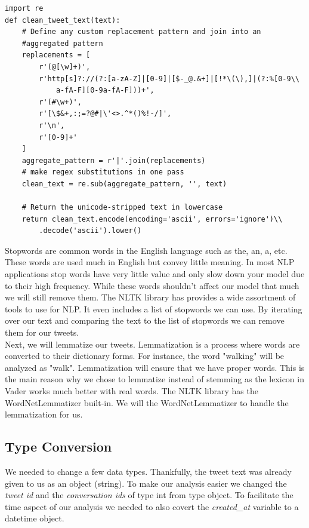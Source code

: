 \documentclass[12pt]{article}
\begin{document}
            \begin{lstlisting}[caption=Regular Expression Cleaner]
import re
def clean_tweet_text(text):
    # Define any custom replacement pattern and join into an 
    #aggregated pattern
    replacements = [
        r'(@[\w]+)',
        r'http[s]?://(?:[a-zA-Z]|[0-9]|[$-_@.&+]|[!*\(\),]|(?:%[0-9\\ 
            a-fA-F][0-9a-fA-F]))+',
        r'(#\w+)',
        r'[\$&+,:;=?@#|\'<>.^*()%!-/]',
        r'\n',
        r'[0-9]+'
    ]
    aggregate_pattern = r'|'.join(replacements)
    # make regex substitutions in one pass
    clean_text = re.sub(aggregate_pattern, '', text) 
    
    # Return the unicode-stripped text in lowercase
    return clean_text.encode(encoding='ascii', errors='ignore')\\
        .decode('ascii').lower()
            \end{lstlisting}

            Stopwords are common words in the English language such as the, an, a, etc. These words are used much in English but convey little meaning. In most NLP applications stop
            words have very little value and only slow down your model due to their high frequency. While these words shouldn't affect our model that much we will still remove them. The
            NLTK library has provides a wide assortment of tools to use for NLP. It even includes a list of stopwords we can use. By iterating over our text and comparing the text to
            the list of stopwords we can remove them for our tweets. \\

            Next, we will lemmatize our tweets. Lemmatization is a process where words are converted to their dictionary forms. For instance, the word "walking" will be analyzed as
            "walk". Lemmatization will ensure that we have proper words. This is the main reason why we chose to lemmatize instead of stemming as the lexicon in Vader works much better
            with real words. The NLTK library has the WordNetLemmatizer built-in. We will the WordNetLemmatizer to handle the lemmatization for us. \\

        \subsection{Type Conversion}
            We needed to change a few data types. Thankfully, the tweet text was already given to us as an object (string). To make our analysis easier we changed the \textit{tweet id}
            and the \textit{conversation ids} of type int from type object. To facilitate the time aspect of our analysis we needed to also covert the \textit{created\_at} variable to
            a datetime object. \\
            
\end{document}
